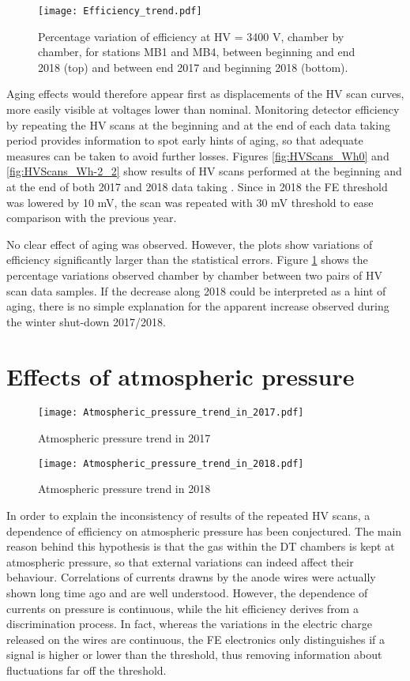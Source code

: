 \documentclass[12pt,twoside,a4paper]{report}
\numberwithin{equation}{section}
\begin{document}
\begin{figure}[!htb]
\begin{center}
\texttt{[image: Efficiency\_trend.pdf]}
\caption{\label{fig:Efficiency_trend} Percentage variation of efficiency at HV = 3400 V, chamber by chamber, for stations MB1 and MB4, between beginning and end 2018 (top) and between end 2017 and beginning 2018 (bottom).}
\end{center}
\end{figure}

Aging effects would therefore appear first as displacements of the HV scan curves, more easily visible at voltages lower than nominal. Monitoring detector efficiency by repeating the HV scans at the beginning and at the end of each data taking period provides information to spot early hints of aging, so that adequate measures can be taken to avoid further losses.
Figures \ref{fig:HVScans_Wh0} and \ref{fig:HVScans_Wh-2_2} show results of HV scans performed at the beginning and at the end of both 2017 and 2018 data taking . Since in 2018 the FE threshold was lowered by 10 mV, the scan was repeated with 30 mV threshold to ease comparison with the previous year.

No clear effect of aging was observed. However, the plots show variations of efficiency significantly larger than the statistical errors.
Figure \ref{fig:Efficiency_trend} shows the percentage variations observed chamber by chamber between two pairs of HV scan data samples. If the decrease along 2018 could be interpreted as a hint of aging, there is no simple explanation for the apparent increase observed during the winter shut-down 2017/2018.

\section{Effects of atmospheric pressure}
\begin{figure}[!htb]
\texttt{[image: Atmospheric\_pressure\_trend\_in\_2017.pdf]}
\caption{\label{fig:pressure_17} Atmospheric pressure trend in 2017}
\end{figure}
\begin{figure}[!htb]
\texttt{[image: Atmospheric\_pressure\_trend\_in\_2018.pdf]}
\caption{\label{fig:pressure_18} Atmospheric pressure trend in 2018}
\end{figure}

In order to explain the inconsistency of results of the repeated HV scans, a dependence of efficiency on atmospheric pressure has been conjectured.
The main reason behind this hypothesis is that the gas within the DT chambers is kept at atmospheric pressure, so that external variations can indeed affect their behaviour. Correlations of currents drawns by the anode wires were actually shown long time ago and are well understood.
However, the dependence of currents on pressure is continuous, while the hit efficiency derives from a discrimination process. In fact, whereas the variations in the electric charge released on the wires are continuous, the FE electronics only distinguishes if a signal is higher or lower than the threshold, thus removing information about fluctuations far off the threshold.
\end{document}
